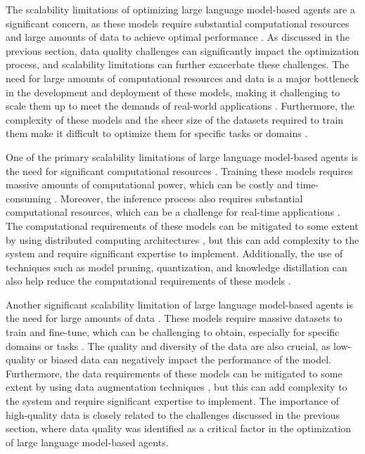\documentclass[11pt]{article}
\begin{document}
The scalability limitations of optimizing large language model-based agents are a significant concern, as these models require substantial computational resources and large amounts of data to achieve optimal performance \cite{ref34}. As discussed in the previous section, data quality challenges can significantly impact the optimization process, and scalability limitations can further exacerbate these challenges. The need for large amounts of computational resources and data is a major bottleneck in the development and deployment of these models, making it challenging to scale them up to meet the demands of real-world applications \cite{ref253}. Furthermore, the complexity of these models and the sheer size of the datasets required to train them make it difficult to optimize them for specific tasks or domains \cite{ref35}.

One of the primary scalability limitations of large language model-based agents is the need for significant computational resources \cite{ref173}. Training these models requires massive amounts of computational power, which can be costly and time-consuming \cite{ref17}. Moreover, the inference process also requires substantial computational resources, which can be a challenge for real-time applications \cite{ref254}. The computational requirements of these models can be mitigated to some extent by using distributed computing architectures \cite{ref255}, but this can add complexity to the system and require significant expertise to implement. Additionally, the use of techniques such as model pruning, quantization, and knowledge distillation can also help reduce the computational requirements of these models \cite{ref17}.

Another significant scalability limitation of large language model-based agents is the need for large amounts of data \cite{ref256}. These models require massive datasets to train and fine-tune, which can be challenging to obtain, especially for specific domains or tasks \cite{ref257}. The quality and diversity of the data are also crucial, as low-quality or biased data can negatively impact the performance of the model. Furthermore, the data requirements of these models can be mitigated to some extent by using data augmentation techniques \cite{ref33}, but this can add complexity to the system and require significant expertise to implement. The importance of high-quality data is closely related to the challenges discussed in the previous section, where data quality was identified as a critical factor in the optimization of large language model-based agents.
\end{document}
